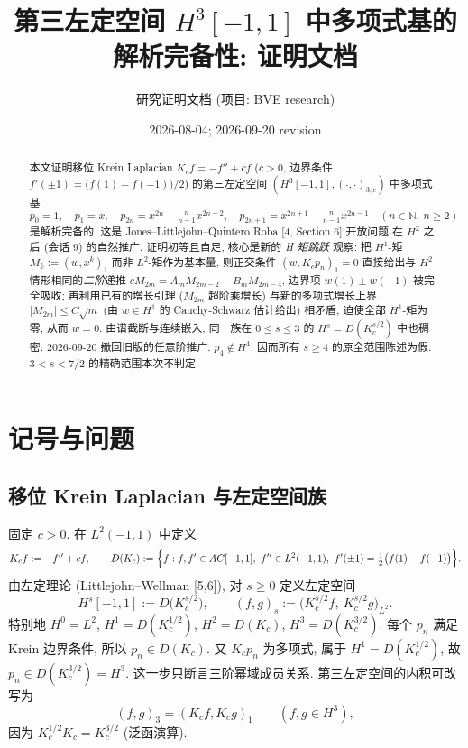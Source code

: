 \documentclass[UTF8]{ctexart}
\title{第三左定空间 \texorpdfstring{$H^3[-1,1]$}{H3} 中多项式基的解析完备性: 证明文档}
\author{研究证明文档 (项目: BVE research)}
\date{2026-08-04; 2026-09-20 revision}
\begin{document}
\maketitle

\begin{abstract}
本文证明移位 Krein Laplacian $K_c f = -f'' + c f$ ($c > 0$, 边界条件
$f'(\pm1) = \bigl(f(1)-f(-1)\bigr)/2$) 的第三左定空间
$(H^3[-1,1], (\cdot,\cdot)_{3,c})$ 中多项式基
\[
	p_0 = 1, \quad p_1 = x, \quad
	p_{2n} = x^{2n} - \tfrac{n}{n-1} x^{2n-2}, \quad
	p_{2n+1} = x^{2n+1} - \tfrac{n}{n-1} x^{2n-1} \quad (n \in \mathbb{N},\ n \geq 2)
\]
是解析完备的. 这是 Jones--Littlejohn--Quintero Roba [4, Section 6] 开放问题
在 $H^2$ 之后 (会话 9) 的自然推广. 证明初等且自足, 核心是新的 \emph{H 矩跳跃}
观察: 把 $H^1$-矩 $M_k := (w, x^k)_1$ 而非 $L^2$-矩作为基本量, 则正交条件
$(w, K_c p_n)_1 = 0$ 直接给出与 $H^2$ 情形相同的\emph{二阶}递推
$c M_{2m} = A_m M_{2m-2} - B_m M_{2m-4}$, 边界项 $w(1)\pm w(-1)$ 被完全吸收;
再利用已有的增长引理 ($M_{2m}$ 超阶乘增长) 与新的多项式增长上界
$|M_{2m}| \leq C\sqrt{m}$ (由 $w \in H^1$ 的 Cauchy-Schwarz 估计给出) 相矛盾,
迫使全部 $H^1$-矩为零, 从而 $w = 0$. 由谱截断与连续嵌入, 同一族在
$0\le s\le3$ 的 $H^s=D(K_c^{s/2})$ 中也稠密.
2026-09-20 撤回旧版的任意阶推广: $p_4\notin H^4$, 因而所有 $s\ge4$
的原全范围陈述为假. $3<s<7/2$ 的精确范围本次不判定.
\end{abstract}

\tableofcontents

\section{记号与问题}

\subsection{移位 Krein Laplacian 与左定空间族}

固定 $c > 0$. 在 $L^2(-1,1)$ 中定义
\begin{equation}
	K_c f := -f'' + c f, \qquad
	D(K_c) := \Bigl\{ f : f, f' \in AC[-1,1],\ f'' \in L^2(-1,1),\
		f'(\pm 1) = \tfrac{1}{2}\bigl( f(1) - f(-1) \bigr) \Bigr\}.
\end{equation}
由左定理论 (Littlejohn--Wellman [5,6]), 对 $s \geq 0$ 定义左定空间
\begin{equation}
	H^s[-1,1] := D\bigl(K_c^{s/2}\bigr), \qquad
	(f, g)_s := \bigl( K_c^{s/2} f,\ K_c^{s/2} g \bigr)_{L^2}.
\end{equation}
特别地 $H^0 = L^2$, $H^1 = D(K_c^{1/2})$, $H^2 = D(K_c)$, $H^3 = D(K_c^{3/2})$.
每个 $p_n$ 满足 Krein 边界条件, 所以 $p_n\in D(K_c)$.
又 $K_cp_n$ 为多项式, 属于 $H^1=D(K_c^{1/2})$, 故
$p_n\in D(K_c^{3/2})=H^3$. 这一步只断言三阶幂域成员关系.
第三左定空间的内积可改写为
\begin{equation}
	(f, g)_3 = (K_c f, K_c g)_1 \qquad (f, g \in H^3),
\end{equation}
因为 $K_c^{1/2} K_c = K_c^{3/2}$ (泛函演算).
\end{document}
